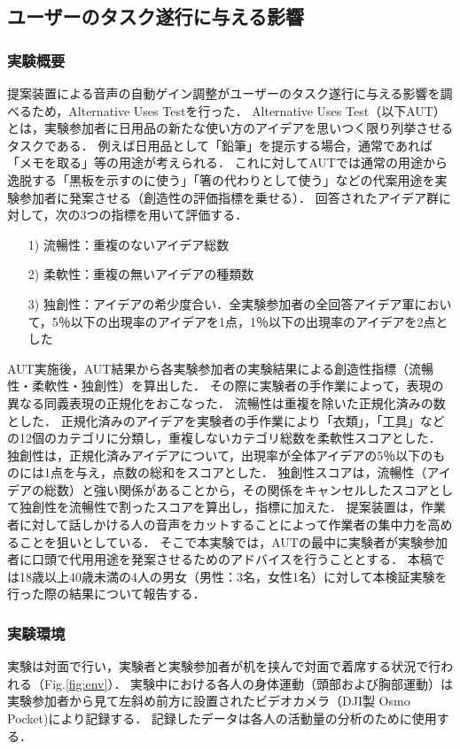 \documentclass[a4paper]{jarticle}
\begin{document}
\subsection{ユーザーのタスク遂行に与える影響}
\subsubsection{実験概要}
提案装置による音声の自動ゲイン調整がユーザーのタスク遂行に与える影響を調べるため，Alternative Uses Test\cite{AUT}を行った．
Alternative Uses Test（以下AUT）とは，実験参加者に日用品の新たな使い方のアイデアを思いつく限り列挙させるタスクである．
例えば日用品として「鉛筆」を提示する場合，通常であれば「メモを取る」等の用途が考えられる．
これに対してAUTでは通常の用途から逸脱する「黒板を示すのに使う」「箸の代わりとして使う」などの代案用途を実験参加者に発案させる（創造性の評価指標を乗せる）．
回答されたアイデア群に対して，次の3つの指標を用いて評価する．
\begin{enumerate}
    \item[1)]流暢性：重複のないアイデア総数
    \item[2)]柔軟性：重複の無いアイデアの種類数
    \item[3)]独創性：アイデアの希少度合い．全実験参加者の全回答アイデア軍において，5％以下の出現率のアイデアを1点，1％以下の出現率のアイデアを2点とした
\end{enumerate}
AUT実施後，AUT結果から各実験参加者の実験結果による創造性指標（流暢性・柔軟性・独創性）を算出した．
その際に実験者の手作業によって，表現の異なる同義表現の正規化をおこなった．
流暢性は重複を除いた正規化済みの数とした．
正規化済みのアイデアを実験者の手作業により「衣類」，「工具」などの12個のカテゴリに分類し，重複しないカテゴリ総数を柔軟性スコアとした．
独創性は，正規化済みアイデアについて，出現率が全体アイデアの5％以下のものには1点を与え，点数の総和をスコアとした．
独創性スコアは，流暢性（アイデアの総数）と強い関係があることから，その関係をキャンセルしたスコアとして独創性を流暢性で割ったスコアを算出し，指標に加えた\cite{AUT2}．
提案装置は，作業者に対して話しかける人の音声をカットすることによって作業者の集中力を高めることを狙いとしている．
そこで本実験では，AUTの最中に実験者が実験参加者に口頭で代用用途を発案させるためのアドバイスを行うこととする．
本稿では18歳以上40歳未満の4人の男女（男性：3名，女性1名）に対して本検証実験を行った際の結果について報告する．
\subsubsection{実験環境}
実験は対面で行い，実験者と実験参加者が机を挟んで対面で着席する状況で行われる（Fig.\ref{fig:env}）．
実験中における各人の身体運動（頭部および胸部運動）は実験参加者から見て左斜め前方に設置されたビデオカメラ（DJI製 Osmo Pocket)により記録する．
記録したデータは各人の活動量の分析のために使用する．
\end{document}
